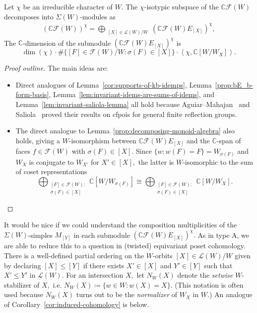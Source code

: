 \documentclass[ALCO, Unicode]{cedram}
\def\C{{\mathbb{C}}}
\begin{document}
 \begin{prop}\label{prop:analogue-W}
Let $\chi$ be an irreducible character of $W.$ The $\chi$-isotypic subspace of the $\C \mathcal{F}(W)$ decomposes into $\Sigma(W)$-modules as
 \begin{align*}
     \left(\C \mathcal{F}(W)\right)^\chi = \bigoplus_{\substack{[X] \in \mathcal{L}(W) / W}} \left(\C \mathcal{F}(W) E_{[X]}\right)^\chi,
 \end{align*}
 The $\C$-dimension of the submodule $  \left(\C \mathcal{F}(W) E_{[X]}\right)^\chi$ is \[\dim \left(\chi\right) \cdot \# \{[F] \in \mathcal{F}(W) / W: \sigma(F) \in [X]\} \cdot \left \langle \chi, \C [W / W_X]\right \rangle.\]
 \end{prop}
 \begin{proof}[Proof outline] The main ideas are:
   \begin{itemize}
        \item Direct analogues of  Lemma~\ref{cor:supports-of-kb-idemps}, Lemma~\ref{prop:bE_b-form-basis}, Lemma~\ref{lem:invariant-idems-are-sums-of-idems}, and Lemma~\ref{lem:invariant-saliola-lemma} all hold because Aguiar--Mahajan~\cite{Aguiar-Mahajan} and Saliola~\cite{saliolaquiverdescalgebra} proved their results on cfpois for general finite reflection groups.
        \item The direct analogue to Lemma~\ref{prop:decomposing-monoid-algebra} also holds, giving a $W$-isomorphism between $\C \mathcal{F}(W)E_{[X]}$ and the $\C$-span of faces $f \in \mathcal{F}(W)$ with $\sigma(F) \in [X].$ Since $\{w: w(F) = F\} = W_{\sigma(F)}$ and $W_X$ is conjugate to $W_{X'}$ for $X' \in [X],$ the latter is $W$-isomorphic to the sum of coset representations\[\bigoplus_{\substack{[F] \in \mathcal{F}(W):\\ \sigma(F) \in [X]}} \C[W / W_{\sigma(F)}] \cong \bigoplus_{\substack{[F] \in \mathcal{F}(W):\\ \sigma(F) \in [X]}} \C[W / W_{X}].\]
     \end{itemize}
 \end{proof}
It would be nice if we could understand the composition multiplicities of the $\Sigma(W)$-simples $M_{[Y]}$ in each submodule $\left(\C \mathcal{F}(W) E_{[X]}\right)^\chi.$ As in type A, we are able to reduce this to a question in (twisted) equivariant poset cohomology. There is a well-defined partial ordering on the $W$-orbits  $[X] \in \mathcal{L}(W) / W$ given by declaring \textbf{$[X] \leq [Y]$} if there exists $X' \in [X]$ and $ Y' \in [Y]$ such that $X'\leq Y'$ in $\mathcal{L}(W).$ For an intersection $X,$ let $N_W(X)$ denote the \textit{setwise} $W$-stabilizer of $X,$ i.e. $N_W(X) \coloneqq  \{w \in W: w(X) = X\}.$ (This notation is often used because $N_W(X)$ turns out to be the \textit{normalizer} of $W_X$ in $W.$) An analogue of Corollary~\ref{cor:induced-cohomology} is below. 
\end{document}

